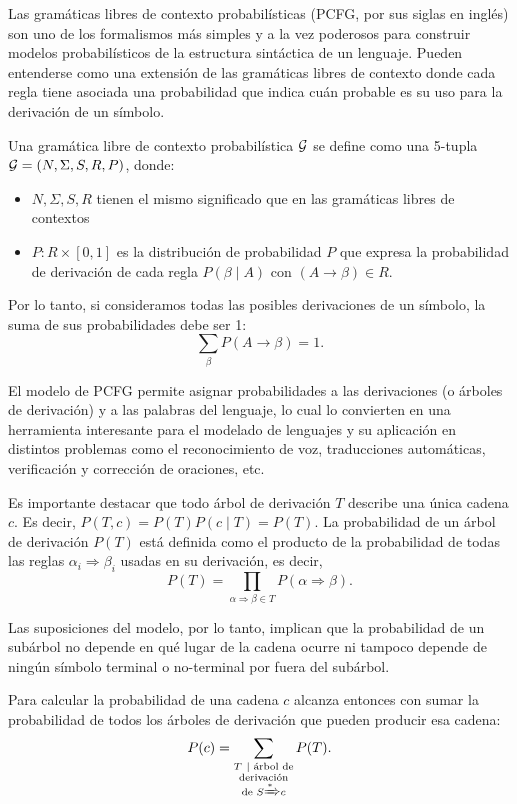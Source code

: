 Las gramáticas libres de contexto probabilísticas (PCFG, por sus siglas en inglés) \cite{booth1969probabilistic} son uno de los formalismos más simples y a la vez poderosos para construir modelos probabilísticos de la estructura sintáctica de un lenguaje. Pueden entenderse como una extensión de las gramáticas libres de contexto donde cada regla tiene asociada una probabilidad que indica cuán probable es su uso para la derivación de un símbolo.

\begin{definicion}[PCFG]
Una gramática libre de contexto probabilística $\gram$ se define como una 5-tupla $\gram = (N, \Sigma, S, R, P)$, donde:
\begin{itemize}
    \item $N, \Sigma, S, R$ tienen el mismo significado que en las gramáticas libres de contextos
    \item $P : R \times [0,1]$ es la distribución de probabilidad $P$ que expresa la probabilidad de derivación de cada regla $P(\beta \mid A)$ con $(A \to \beta) \in R$.
\end{itemize}
Por lo tanto, si consideramos todas las posibles derivaciones de un símbolo, la suma de sus probabilidades debe ser 1:
$$
\sum_{\beta} P (A \to \beta) = 1.
$$
\end{definicion}
El modelo de PCFG permite asignar probabilidades a las derivaciones (o árboles de derivación) y a las palabras del lenguaje, lo cual lo convierten en una herramienta interesante para el modelado de lenguajes y su aplicación en distintos problemas como el reconocimiento de voz, traducciones automáticas, verificación y corrección de oraciones, etc.

Es importante destacar que todo árbol de derivación $T$ describe una única cadena $c$. Es decir, $P(T,c) = P(T) P(c\mid T) = P(T)$. La probabilidad de un árbol de derivación $P(T)$ está definida como el producto de la probabilidad de todas las reglas $\alpha_{i} \Rightarrow \beta_i$ usadas en su derivación, es decir,
$$
P(T) = \prod_{\alpha \Rightarrow \beta\in T} P(\alpha \Rightarrow \beta).
$$

Las suposiciones del modelo, por lo tanto, implican que la probabilidad de un subárbol no depende en qué lugar de la cadena ocurre ni tampoco depende de ningún símbolo terminal o no-terminal por fuera del subárbol.

Para calcular la probabilidad de una cadena $c$ alcanza entonces con sumar la probabilidad de todos los árboles de derivación que pueden producir esa cadena:
%
$$
P(c) = \sum_{\substack{T\ \mid \text{ árbol de}\\\text{derivación} \\  \text{de } S \xRightarrow{\ast} c }}   P (T).
$$



